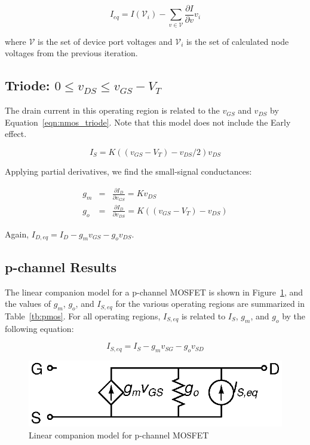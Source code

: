\documentclass{article}
\begin{document}
\begin{equation}
\label{eqn:bias_current}
I_{eq}=I(\mathcal{V}_i)-\sum_{v \in \mathcal{V}}\frac{\partial I}{\partial v}v_i
\end{equation}

where $\mathcal{V}$ is the set of device port voltages and $\mathcal{V}_i$ is the set of calculated node voltages from the previous iteration.

\subsection{Triode: $ 0 \leq v_{DS} \leq v_{GS}-V_T $}

The drain current in this operating region is related to the $v_{GS}$ and $v_{DS}$ by Equation~\ref{eqn:nmos_triode}.  Note that this model does not include the Early effect.

\begin{equation}
\label{eqn:nmos_triode}
I_S=K((v_{GS}-V_T)-v_{DS}/2)v_{DS}
\end{equation}

Applying partial derivatives, we find the small-signal conductances:

\begin{eqnarray}
g_m&=&\frac{\partial I_D}{\partial v_{GS}}=Kv_{DS} \\
g_o&=&\frac{\partial I_D}{\partial v_{DS}}=K((v_{GS}-V_T)-v_{DS})
\end{eqnarray}

Again, $I_{D,eq}=I_D-g_mv_{GS}-g_ov_{DS}$.

\pagebreak

\subsection{p-channel Results}

The linear companion model for a p-channel MOSFET is shown in Figure~\ref{fig:pmos}, and the values of $g_m$, $g_o$, and $I_{S,eq}$ for the various operating regions are summarized in Table~\ref{tb:pmos}.  For all operating regions, $I_{S,eq}$ is related to $I_S$, $g_m$, and $g_o$ by the following equation:

\begin{equation}
I_{S,eq} =  I_S - g_m v_{SG} - g_o v_{SD}
\end{equation}

\begin{figure}[h]
\begin{center}
\includegraphics{../fig/pmos.eps}
\caption{Linear companion model for p-channel MOSFET \label{fig:pmos}}
\end{center}
\end{figure}
\end{document}
